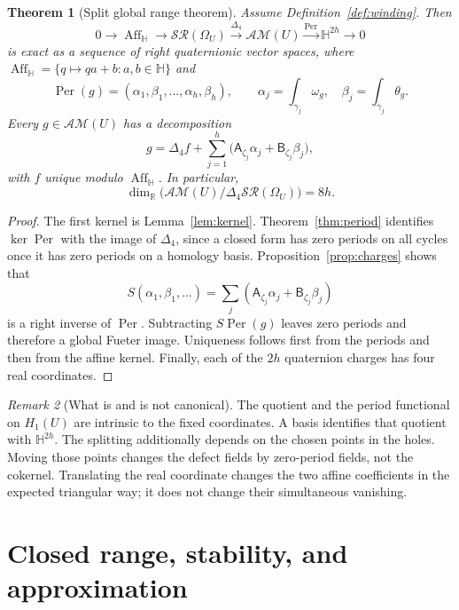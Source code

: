 \documentclass[11pt,a4paper]{article}
\numberwithin{equation}{section}
\newtheorem{theorem}{Theorem}[section]
\theoremstyle{definition}
\theoremstyle{remark}
\newtheorem{remark}[theorem]{Remark}
\newcommand{\R}{\mathbb R}
\newcommand{\HH}{\mathbb H}
\newcommand{\AM}{\mathcal{AM}}
\newcommand{\SR}{\mathcal{SR}}
\newcommand{\Lap}{\Delta_4}
\newcommand{\Aff}{\operatorname{Aff}_{\HH}}
\newcommand{\Per}{\operatorname{Per}}
\newcommand{\Adef}{\mathsf A}
\newcommand{\Bdef}{\mathsf B}
\begin{document}
\begin{theorem}[Split global range theorem]\label{thm:finite-range}
Assume Definition~\ref{def:winding}. Then
\begin{equation}
 0\longrightarrow\Aff
 \longrightarrow\SR(\Omega_U)
 \xrightarrow{\Lap}\AM(U)
 \xrightarrow{\Per}\HH^{2h}
 \longrightarrow0
 \label{eq:exact-sequence}
\end{equation}
is exact as a sequence of right quaternionic vector spaces, where
$\Aff=\{q\mapsto qa+b:a,b\in\HH\}$ and
\[
 \Per(g)=(\alpha_1,\beta_1,\ldots,\alpha_h,\beta_h),\qquad
 \alpha_j=\int_{\gamma_j}\omega_g,\quad
 \beta_j=\int_{\gamma_j}\theta_g.
\]
Every $g\in\AM(U)$ has a decomposition
\begin{equation}
 g=\Lap f+\sum_{j=1}^h
       \bigl(\Adef_{\zeta_j}\alpha_j+\Bdef_{\zeta_j}\beta_j\bigr),
 \label{eq:decomp}
\end{equation}
with $f$ unique modulo $\Aff$. In particular,
\[
 \dim_{\R}\bigl(\AM(U)/\Lap\SR(\Omega_U)\bigr)=8h.
\]
\end{theorem}
\begin{proof}
The first kernel is Lemma~\ref{lem:kernel}. Theorem~\ref{thm:period}
identifies $\ker\Per$ with the image of $\Lap$, since a closed form
has zero periods on all cycles once it has zero periods on a homology
basis. Proposition~\ref{prop:charges} shows that
\[
 S(\alpha_1,\beta_1,\ldots)=
 \sum_j(\Adef_{\zeta_j}\alpha_j+\Bdef_{\zeta_j}\beta_j)
\]
is a right inverse of $\Per$. Subtracting $S\Per(g)$ leaves zero
periods and therefore a global Fueter image. Uniqueness follows first
from the periods and then from the affine kernel. Finally, each of the
$2h$ quaternion charges has four real coordinates.
\end{proof}

\begin{remark}[What is and is not canonical]
The quotient and the period functional on $H_1(U)$ are intrinsic to the
fixed coordinates. A basis identifies that quotient with $\HH^{2h}$.
The splitting additionally depends on the chosen points in the holes.
Moving those points changes the defect fields by zero-period fields,
not the cokernel. Translating the real coordinate changes the two affine
coefficients in the expected triangular way; it does not change their
simultaneous vanishing.
\end{remark}

\section{Closed range, stability, and approximation}
\label{sec:estimates}
\end{document}
